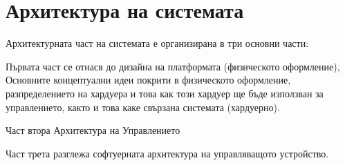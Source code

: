 \section{Архитектура на системата}

Архитектурната част на системата е организирана в три основни части:

Първата част се отнася до дизайна на платформата (физическото оформление),
Основните концептуални идеи покрити в физическото оформление, разпределението на хардуера
и това как този хардуер ще бъде използван за управлението, както и това каке свързана системата (хардуерно).

Част втора Архитектура на Управлението 

Част трета разглежа софтуерната архитектура на управляващото устройство. 

\cite{stmcurefman} 




